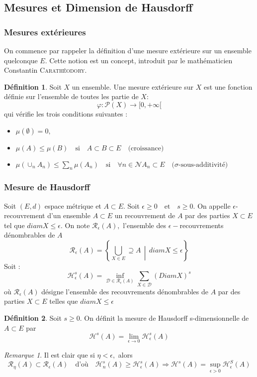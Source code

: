 \documentclass[12pt,a4paper]{report}
\theoremstyle{plain}
\theoremstyle{plain}
\theoremstyle{definition}
\newtheorem{definition}{Définition}
\theoremstyle{remark}
\newtheorem*{rmq}{Remarque}
\newcommand{\enstq}[2]{\left\{#1\,\middle|\,#2\right\}}
\newcommand{\N}[1]{\mathcal{N}}
\newcommand{\textm}[1]{\quad \text{#1} \quad}
\begin{document}
	\subsection{Mesures et Dimension de Hausdorff}
	\subsubsection{Mesures extérieures}
On commence par rappeler la définition d'une mesure extérieure sur un ensemble quelconque $E$. Cette notion est un concept, introduit par le mathématicien Constantin \textsc{Carathéodory}. 

\begin{definition}
Soit $X$ un ensemble. Une mesure extérieure sur $X$ est une fonction définie sur l'ensemble de toutes les partie de $X$:
\[\varphi : \mathcal{P}(X) \longrightarrow [0, +\infty[\]
qui vérifie les trois conditions suivantes :
\begin{itemize}
\item $\mu (\emptyset) = 0,$
\item $\mu(A)\leq \mu (B) \textm{si} A\subset B \subset E \textm{(croissance)}$
\item $\mu (\cup_n A_n) \leq \sum_n \mu (A_n) \textm{si} \forall n \in \N, A_n \subset E \textm{($\sigma$-sous-additivité)}$
\end{itemize}
\end{definition}

	\subsubsection{Mesure de Hausdorff}
Soit $(E,d)$ espace métrique et $A \subset E.$ Soit $\epsilon \geq 0 \textm{et} s \geq 0.$ On appelle $\epsilon$-recouvrement d'un ensemble $A \subset E$ un recouvrement de $A$ par des parties $X \subset E$ tel que $diam X \leq \epsilon.$ On note $\mathcal{R}_\epsilon(A),$ l'ensemble des $\epsilon-$recouvrements dénombrables de $A$
\[\mathcal{R}_\epsilon (A)= \enstq{\bigcup_{X \in E}\supseteq A}{diam X \leq \epsilon}\]
Soit :
\[\mathcal{H}_\epsilon^s (A) = \inf_{\mathcal{D}\in \mathcal{R}_\epsilon(A)}\sum_{X \in \mathcal{D}}(Diam X)^s\]
où $\mathcal{R}_\epsilon (A)$ désigne l'ensemble des recouvrements dénombrables de $A$ par des parties $X \subset E$ telles que $diam X \leq \epsilon$

\begin{definition}
Soit $s \geq 0.$ On définit la mesure de Hausdorff s-dimensionnelle de $A \subset E$ par
\[\mathcal{H}^s(A) = \lim\limits_{\epsilon \rightarrow 0} \mathcal{H}_\epsilon^s(A)\]
\end{definition}
\begin{rmq}
Il est clair que si $\eta < \epsilon,$ alors \[\mathcal{R}_\eta (A) \subset \mathcal{R}_\epsilon(A) \textm{d'où} 
\mathcal{H}_n^s(A)\geq\mathcal{H}_\epsilon^s(A) \Rightarrow \mathcal{H}^s(A) = \sup_{\epsilon > 0}\mathcal{H}_\epsilon^S(A)\]
\end{rmq}
\end{document}
